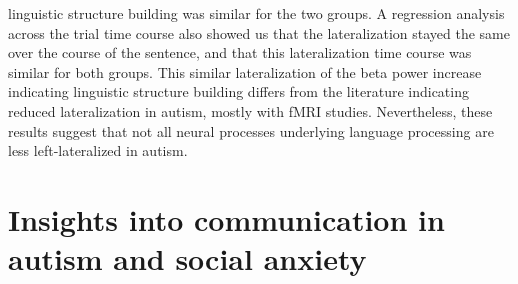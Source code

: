 linguistic structure building was similar for the two groups. A regression analysis across the trial time course also showed us that the lateralization stayed the same over the course of the sentence, and that this lateralization time course was similar for both groups. This similar lateralization of the beta power increase indicating linguistic structure building differs from the literature indicating reduced lateralization in autism, mostly with fMRI studies. Nevertheless, these results suggest that not all neural processes underlying language processing are less left-lateralized in autism.  

\section{Insights into communication in autism and social anxiety}
